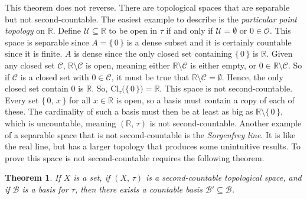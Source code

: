 \documentclass{article}
\theoremstyle{plain}
\newtheorem{theorem}{Theorem}[section]
\theoremstyle{normal}
\newenvironment{example}{%
    \pushQED{\qed}\renewcommand{\qedsymbol}{$\blacksquare$}\examplex%
}{%
    \popQED\endexamplex%
}
\begin{document}
        \begin{example}[\textbf{The Particular Point Topology}]
            This theorem does not reverse. There are topological spaces that
            are separable but not second-countable. The easiest example to
            describe is the \textit{particular point topology} on
            $\mathbb{R}$. Define $\mathcal{U}\subseteq\mathbb{R}$ to be open in
            $\tau$ if and only if $\mathcal{U}=\emptyset$ or $0\in\mathcal{O}$.
            This space is separable since $A=\{\,0\,\}$ is a dense subset and it
            is certainly countable since it is finite. $A$ is dense since the
            only closed set containing $\{\,0\,\}$ is $\mathbb{R}$.
            Given any closed set $\mathcal{C}$, $\mathbb{R}\setminus\mathcal{C}$
            is open, meaning either $\mathbb{R}\setminus\mathcal{C}$ is either
            empty, or $0\in\mathbb{R}\setminus\mathcal{C}$. So if
            $\mathcal{C}$ is a closed set with $0\in\mathcal{C}$, it must be
            true that $\mathbb{R}\setminus\mathcal{C}=\emptyset$. Hence, the
            only closed set contain $0$ is $\mathbb{R}$. So,
            $\textrm{Cl}_{\tau}\big(\{\,0\,\}\big)=\mathbb{R}$. This space is
            not second-countable. Every set
            $\{\,0,\,x\,\}$ for all $x\in\mathbb{R}$ is open, so a basis must
            contain a copy of each of these. The cardinality of such a basis
            must then be at least as big as $\mathbb{R}\setminus\{\,0\,\}$,
            which is uncountable, meaning $(\mathbb{R},\,\tau)$ is not
            second-countable.
        \end{example}
        Another example of a separable space that is not second-countable is
        the \textit{Sorgenfrey line}. It is like the real line, but has a
        larger topology that produces some unintuitive results. To prove this
        space is not second-countable requires the following theorem.
        \begin{theorem}
            If $X$ is a set, if $(X,\,\tau)$ is a second-countable topological
            space, and if $\mathcal{B}$ is a basis for $\tau$, then there exists
            a countable basis $\mathcal{B}'\subseteq\mathcal{B}$.
        \end{theorem}
\end{document}
